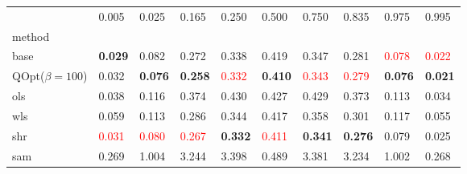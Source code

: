 \begin{tabular}{llllllllll}
\toprule
 & 0.005 & 0.025 & 0.165 & 0.250 & 0.500 & 0.750 & 0.835 & 0.975 & 0.995 \\
method &  &  &  &  &  &  &  &  &  \\
\midrule
base & \textbf{0.029} & 0.082 & 0.272 & 0.338 & 0.419 & 0.347 & 0.281 & \textcolor{red}{0.078} & \textcolor{red}{0.022} \\
\midrule
QOpt($\beta=100$) & 0.032 & \textbf{0.076} & \textbf{0.258} & \textcolor{red}{0.332} & \textbf{0.410} & \textcolor{red}{0.343} & \textcolor{red}{0.279} & \textbf{0.076} & \textbf{0.021} \\
ols & 0.038 & 0.116 & 0.374 & 0.430 & 0.427 & 0.429 & 0.373 & 0.113 & 0.034 \\
wls & 0.059 & 0.113 & 0.286 & 0.344 & 0.417 & 0.358 & 0.301 & 0.117 & 0.055 \\
shr & \textcolor{red}{0.031} & \textcolor{red}{0.080} & \textcolor{red}{0.267} & \textbf{0.332} & \textcolor{red}{0.411} & \textbf{0.341} & \textbf{0.276} & 0.079 & 0.025 \\
sam & 0.269 & 1.004 & 3.244 & 3.398 & 0.489 & 3.381 & 3.234 & 1.002 & 0.268 \\
\bottomrule
\end{tabular}